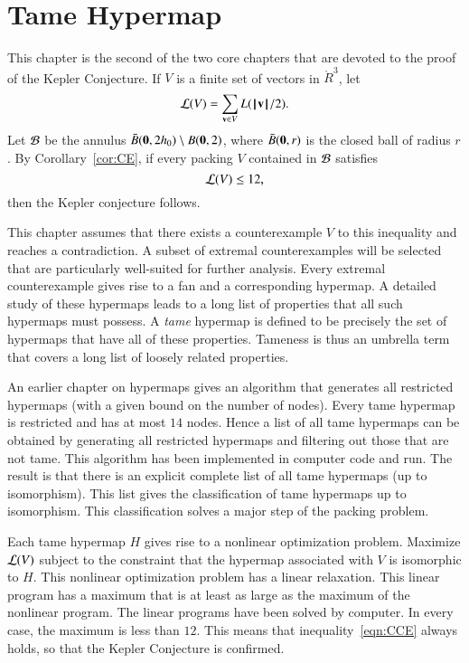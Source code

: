 


\chapter{Tame Hypermap}
%

\label{sec:tame}
%

\begin{summary}
This chapter is the second of the two core chapters that are devoted to the proof of the Kepler Conjecture.  If $V$ is a finite set of vectors in $\ring{R}^3$, let
$${\mathcal L}(V) = \sum_{{\mathbf v}\in V} L({{\hskip0.1em|\hskip-0.15em|\hskip0.1em}{\mathbf v}{\hskip0.1em|\hskip-0.15em|\hskip0.1em}}/2).$$
Let ${\mathcal B}$ be the
annulus $\bar B({\mathbf 0},2h_0)\setminus B({\mathbf 0},2)$, where
$\bar B({\mathbf 0},r)$ is the closed ball of radius $r$.
By Corollary~\ref{cor:CE}, if every packing $V$
contained in ${\mathcal B}$
satisfies
\begin{equation}\label{eqn:CCE}
{\mathcal L}(V) \le 12,
\end{equation}
then the Kepler conjecture follows.

This chapter assumes that there exists a counterexample $V$ to this inequality and reaches a contradiction.  A subset of extremal counterexamples will be selected that are particularly well-suited for further analysis.  Every extremal counterexample gives rise to a fan and a corresponding hypermap.  
A detailed study of these hypermaps leads to a long list of properties that all such hypermaps must
possess.   A {\it tame} hypermap is defined to be precisely the set of hypermaps that have all of these
properties.   Tameness is thus an umbrella term that covers a long list of loosely related properties.

An earlier chapter on hypermaps gives an algorithm that generates all restricted hypermaps (with a given bound on the number of nodes).   Every tame hypermap is restricted and has at most $14$ nodes.  Hence a list of all tame hypermaps can be obtained by generating all restricted hypermaps and filtering out those that are not tame.   This algorithm has been implemented in computer code and run.  The result is that there is an explicit complete list of all tame hypermaps (up to isomorphism).  
This list gives the classification of tame hypermaps up to isomorphism.   This classification solves a
major step of the packing problem.

Each tame hypermap $H$ gives rise to a nonlinear optimization problem.   Maximize ${\mathcal L}(V)$ subject to the constraint that the hypermap associated with  $V$ 
is isomorphic to $H$.  This nonlinear optimization problem has a linear relaxation.  This linear program has
a maximum that is at least as large as the maximum of the nonlinear program.  The linear programs
have been solved by computer.  In every case, the maximum is less than $12$.  This means
that inequality~\ref{eqn:CCE} always holds, so that the Kepler Conjecture is confirmed.
\end{summary}
%
%



